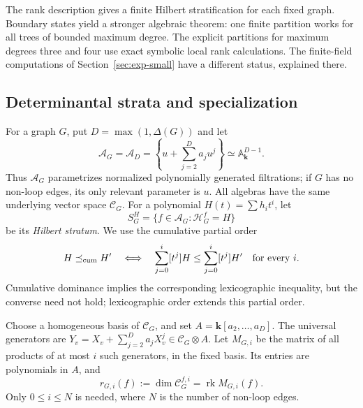 \documentclass[reqno]{article}
\theoremstyle{plain} %
\theoremstyle{definition}
\theoremstyle{remark}
\DeclareMathOperator{\rank}{rk}
\newcommand{\K} {\mathbf{k}}
\newcommand {\CC}{\mathscr{C}}
\newcommand{\cA}{{\mathscr{A}}}
\newcommand{\hs}{\mathscr{H}}
\numberwithin{equation}{section}
\begin{document}
The rank description gives a finite Hilbert stratification for each
fixed graph. Boundary states yield a stronger algebraic theorem: one
finite partition works for all trees of bounded maximum degree.
The explicit partitions for maximum degrees three and four use exact
symbolic local rank calculations. The finite-field computations of
Section~\ref{sec:exp-small} have a different status, explained there.

\subsection{Determinantal strata and specialization}
\label{sec:par-space}

For a graph $G$, put $D=\max(1,\Delta(G))$ and let
\begin{equation}\label{eq:poly-space}
\cA_G=\cA_D=
\left\{u+\sum_{j=2}^D a_ju^j\right\}\simeq\mathbb A^{D-1}_\K.
\end{equation}
Thus $\cA_G$ parametrizes normalized polynomially generated filtrations; if
$G$ has no non-loop edges, its only relevant parameter is $u$.
All algebras have the same underlying vector space $\CC_G$.
For a polynomial $H(t)=\sum h_it^i$, let
\[
S_G^H=\{f\in\cA_G:\hs_G^f=H\}
\]
be its \emph{Hilbert stratum}. We use the cumulative partial order
\begin{equation}\label{eq:cumulative-order}
H\preceq_{\rm cum}H'
\quad\Longleftrightarrow\quad
\sum_{j=0}^i[t^j]H\le\sum_{j=0}^i[t^j]H'
\quad\text{for every }i.
\end{equation}
Cumulative dominance implies the corresponding lexicographic inequality,
but the converse need not hold; lexicographic order extends this partial
order.

Choose a homogeneous basis of $\CC_G$, and set
$A=\K[a_2,\ldots,a_D]$. The universal generators are
$Y_v=X_v+\sum_{j=2}^Da_jX_v^j\in\CC_G\otimes A$.
Let $M_{G,i}$ be the matrix of all products of at most $i$ such generators,
in the fixed basis. Its entries are polynomials in $A$, and
\begin{equation}\label{eq:universal-rank}
r_{G,i}(f):=\dim\CC_G^{f,i}=\rank M_{G,i}(f).
\end{equation}
Only $0\le i\le N$ is needed, where $N$ is the number of non-loop edges.
\end{document}
